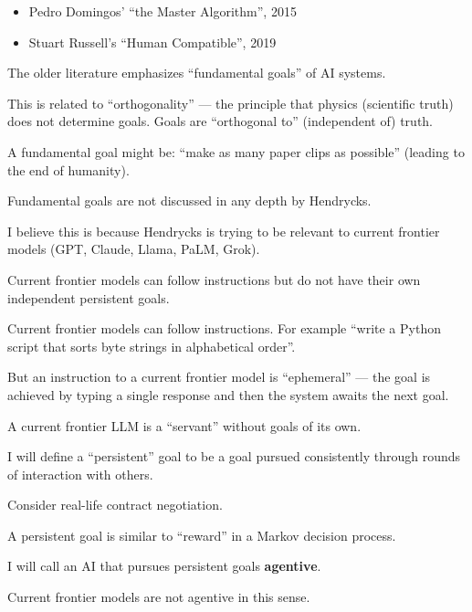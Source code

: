 {\begin{itemize}
\vfill
\item Pedro Domingos' ``the Master Algorithm'', 2015

\vfill
\item Stuart Russell's ``Human Compatible'', 2019
\end{itemize}


The older literature emphasizes  ``fundamental goals'' of AI systems.

\vfill
This is related to ``orthogonality'' --- the principle that physics (scientific truth)
does not determine goals.  Goals are ``orthogonal to'' (independent of) truth.

\vfill
A fundamental goal might be: ``make as many paper clips as possible'' (leading to the end of humanity).


Fundamental goals are not discussed in any depth by Hendrycks.

\vfill
I believe this is because Hendrycks is trying to be relevant to current frontier models (GPT, Claude, Llama, PaLM, Grok).

\vfill
Current frontier models can follow instructions but do not have their own independent persistent goals.


Current frontier models can follow instructions. For example ``write a Python script that sorts byte strings in alphabetical order''.

\vfill
But an instruction to a current frontier model is ``ephemeral'' --- the goal is achieved by typing a single response and then the system awaits the next goal.

\vfill
A current frontier LLM is a ``servant'' without goals of its own.


I will define a ``persistent'' goal to be a goal pursued consistently through rounds of interaction with others.

\vfill
Consider real-life contract negotiation.

\vfill
A persistent goal is similar to ``reward'' in a Markov decision process.


I will call an AI that pursues persistent goals {\bf agentive}.

\vfill
Current frontier models are not agentive in this sense.

}
